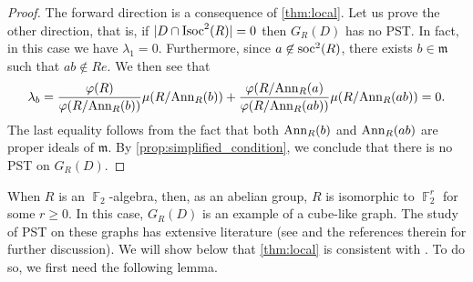 \documentclass[12pt, a4paper]{amsart}
\theoremstyle{definition}
\DeclareMathOperator{\F}{\mathbb{F}}
\newcommand{\Ann}{{\rm Ann}}
\numberwithin{equation}{section}
\newcommand{\soc}{{{\rm soc}}}
\newcommand{\Isoc}{{{\rm Isoc}}}
\begin{document}
\begin{proof}
    The forward direction is a consequence of \cref{thm:local}. Let us prove the other direction, that is, if $|D \cap \Isoc^2(R)|=0$ then $G_{R}(D)$ has no PST. In fact, in this case we have $\lambda_1 =0.$ Furthermore, since $a \not \in \soc^2(R)$, there exists $b \in \mathfrak{m}$ such that $ab \not \in Re.$ We then see that
    \[ \lambda_b = \frac{\varphi(R)}{\varphi(R/\Ann_{R}(b))} \mu(R/\Ann_{R}(b)) + \frac{\varphi(R/\Ann_{R}(a)}{\varphi(R/\Ann_{R}(ab))} \mu(R/\Ann_{R}(ab)) =0.\]
    The last equality follows from the fact that both $\Ann_{R}(b)$ and $\Ann_{R}(ab)$ are proper ideals of $\mathfrak{m}.$ By \cref{prop:simplified_condition}, we conclude that there is no PST on $G_{R}(D).$
\end{proof}



When $R$ is an $\F_2$-algebra, then, as an abelian group, $R$ is isomorphic to $\F_2^r$ for some $r \geq 0.$ In this case, $G_{R}(D)$ is an example of a cube-like graph. The study of PST on these graphs has extensive literature (see \cite{cheung2011perfect} and the references therein for further discussion). We will show below that \cref{thm:local} is consistent with \cite[Theorem 2.3]{cheung2011perfect}. To do so, we first need the following lemma. 
 
\end{document}
